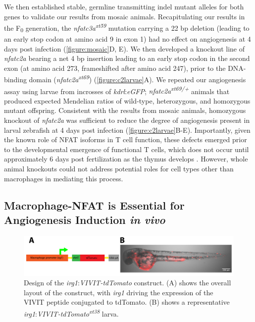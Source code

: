 We then established stable, germline transmitting indel mutant alleles for both genes to validate our results from mosaic animals. Recapitulating our results in the F\textsubscript{0} generation, the \textit{nfatc3a\textsuperscript{xt59}} mutation carrying a 22 bp deletion (leading to an early stop codon at amino acid 9 in exon 1) had no effect on angiogenesis at 4 days post infection (\autoref{figure:mosaic}D, E). We then developed a knockout line of \textit{nfatc2a} bearing a net 4 bp insertion leading to an early stop codon in the second exon (at amino acid 273, frameshifted after amino acid 247), prior to the DNA\hyp{}binding domain (\textit{nfatc2a\textsuperscript{xt69}}) (\autoref{figure:c2larvae}A). We repeated our angiogenesis assay using larvae from incrosses of \textit{kdrl}:\textit{eGFP}; \textit{nfatc2a\textsuperscript{xt69/+}} animals that produced expected Mendelian ratios of wild\hyp{}type, heterozygous, and homozygous mutant offspring. Consistent with the results from mosaic animals, homozygous knockout of \textit{nfatc2a} was sufficient to reduce the degree of angiogenesis present in larval zebrafish at 4 days post infection (\autoref{figure:c2larvae}B\hyp{}E). Importantly, given the known role of NFAT isoforms in T cell function, these defects emerged prior to the developmental emergence of functional T cells, which does not occur until approximately 6 days post fertilization as the thymus develops \citep{Trede2004}. However, whole animal knockouts could not address potential roles for cell types other than macrophages in mediating this process. 

\subsection{Macrophage\hyp{}NFAT is Essential for Angiogenesis Induction \textit{in vivo}}

\begin{figure}
\centering
\includegraphics[width=\textwidth]{images/vivitconstruct.pdf}
\caption{Design of the \textit{irg1}:\textit{VIVIT\hyp{}tdTomato} construct. (A) shows the overall layout of the construct, with \textit{irg1} driving the expression of the VIVIT peptide conjugated to tdTomato. (B) shows a representative \textit{irg1}:\textit{VIVIT\hyp{}tdTomato\textsuperscript{xt38}} larva.}
\label{figure:vivitdiagram}
\end{figure}

